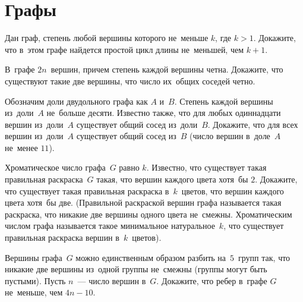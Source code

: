 
\section*{Графы}


\begin{problems}


\item
Дан граф, степень любой вершины которого не~меньше $k$, где $k > 1$.
Докажите, что в~этом графе найдется простой цикл длины не~меньшей, чем $k + 1$.

\item
В~графе $2 n$~вершин, причем степень каждой вершины четна.
Докажите, что существуют такие две вершины, что число их~общих соседей четно.

\item
Обозначим доли двудольного графа как $A$ и~$B$.
Степень каждой вершины из~доли~$A$ не~больше десяти.
Известно также, что для любых одиннадцати вершин из~доли~$A$ существует общий
сосед из~доли~$B$.
Докажите, что для всех вершин из~доли~$A$ существует общий сосед из~$B$
(число вершин в~доле~$A$ не~менее $11$).

\item
Хроматическое число графа~$G$ равно $k$.
Известно, что существует такая правильная раскраска~$G$ такая, что вершин
каждого цвета хотя~бы $2$.
Докажите, что существует такая правильная раскраска в~$k$~цветов, что вершин
каждого цвета хотя~бы две.
(Правильной раскраской вершин графа называется такая раскраска, что никакие две
вершины одного цвета не~смежны.
Хроматическим числом графа называется такое минимальное натуральное~$k$, что
существует правильная раскраска вершин в~$k$~цветов).

\item
Вершины графа~$G$ можно единственным образом разбить на~$5$~групп так, что
никакие две вершины из~одной группы не~смежны (группы могут быть пустыми).
Пусть $n$~--- число вершин в~$G$.
Докажите, что ребер в~графе $G$ не~меньше, чем $4 n - 10$.


\end{problems}
